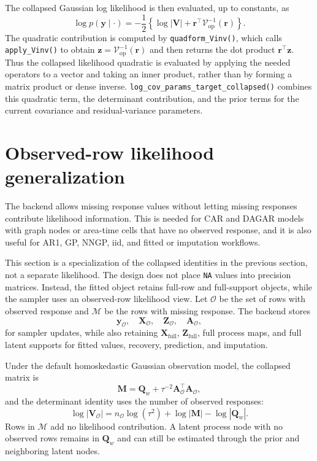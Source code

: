\documentclass[11pt]{article}
\newcommand{\by}{\bm{y}}
\newcommand{\br}{\bm{r}}
\newcommand{\bz}{\bm{z}}
\newcommand{\bA}{\bm{A}}
\newcommand{\bM}{\bm{M}}
\newcommand{\bQ}{\bm{Q}}
\newcommand{\bV}{\bm{V}}
\newcommand{\bX}{\bm{X}}
\newcommand{\bZ}{\bm{Z}}
\newcommand{\trans}{^\top}
\begin{document}
The collapsed Gaussian log likelihood is then evaluated, up to constants, as
\begin{equation}
  \label{eq:collapsed-loglik}
  \log p(\by\mid\cdot)
  =
  -\frac{1}{2}
  \left\{
    \log|\bV| +
    \br\trans \mathcal{V}^{-1}_{\mathrm{op}}(\br)
  \right\}.
\end{equation}
The quadratic contribution is computed by \texttt{quadform\_Vinv()}, which calls \texttt{apply\_Vinv()} to obtain $\bz=\mathcal{V}^{-1}_{\mathrm{op}}(\br)$ and then returns the dot product $\br\trans\bz$. Thus the collapsed likelihood quadratic is evaluated by applying the needed operators to a vector and taking an inner product, rather than by forming a matrix product or dense inverse. \texttt{log\_cov\_params\_target\_collapsed()} combines this quadratic term, the determinant contribution, and the prior terms for the current covariance and residual-variance parameters.

\section{Observed-row likelihood generalization}\label{missing}

The backend allows missing response values without letting missing responses contribute likelihood information. This is needed for CAR and DAGAR models with graph nodes or area-time cells that have no observed response, and it is also useful for AR1, GP, NNGP, iid, and fitted or imputation workflows.

This section is a specialization of the collapsed identities in the previous section, not a separate likelihood. The design does not place \texttt{NA} values into precision matrices. Instead, the fitted object retains full-row and full-support objects, while the sampler uses an observed-row likelihood view. Let $\mathcal{O}$ be the set of rows with observed response and $\mathcal{M}$ be the rows with missing response. The backend stores
\begin{equation}
  \by_{\mathcal{O}},\quad \bX_{\mathcal{O}},\quad \bZ_{\mathcal{O}},\quad
  \bA_{\mathcal{O}},
\end{equation}
for sampler updates, while also retaining $\bX_{\mathrm{full}}$, $\bZ_{\mathrm{full}}$, full process maps, and full latent supports for fitted values, recovery, prediction, and imputation.

Under the default homoskedastic Gaussian observation model, the collapsed matrix is
\begin{equation}
  \bM = \bQ_w + \tau^{-2} \bA_{\mathcal{O}}\trans \bA_{\mathcal{O}},
\end{equation}
and the determinant identity uses the number of observed responses:
\begin{equation}
  \log|\bV_{\mathcal{O}}|
    = n_{\mathcal{O}}\log(\tau^2) + \log|\bM| - \log|\bQ_w|.
\end{equation}
Rows in $\mathcal{M}$ add no likelihood contribution. A latent process node with no observed rows remains in $\bQ_w$ and can still be estimated through the prior and neighboring latent nodes.
\end{document}

